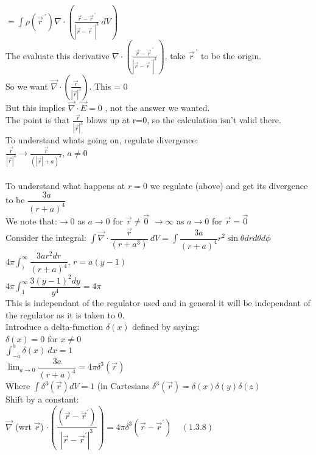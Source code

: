 \documentclass[a4paper,11pt]{article}
\begin{document}
$=  \int \rho (\vec{r}^{~'}) \nabla \cdot (\frac{\vec{r} - \vec{r}^{~'}}{|\vec{r} - \vec{r}^{~'}|^3}~dV)$\\
The evaluate this derivative $ \nabla \cdot (\frac{\vec{r} - \vec{r}^{~'}}{|\vec{r} - \vec{r}^{~'}|^3})$, take $\vec{r}^{~'}$ to be the origin.\\
So we want $\vec{\nabla} \cdot (\frac{\vec{r}}{|\vec{r}|^3})$. This = 0\\
But this implies $\vec{\nabla} \cdot \vec{E} = 0$ , not the answer we wanted.\\
The point is that $\frac{\vec{r}}{|\vec{r}|^3}$ blows up at r=0, so the calculation isn't valid there.\\
To understand whats going on, regulate divergence:\\
$\frac{\vec{r}}{|\vec{r}|^3} \rightarrow \frac{\vec{r}}{(|\vec{r}|+a)^3}$, $a\neq 0$\\
\\
To understand what happens at $r=0$ we regulate (above) and get its divergence to be $\dfrac{3a}{(r+a)^4}$\\
We note that:$\rightarrow 0$ as $a\rightarrow 0$ for $\vec{r}\neq \vec{0}$
$\rightarrow \infty$ as $a\rightarrow 0$ for $\vec{r} = \vec{0}$\\
Consider the integral:
$\int \vec{\nabla} \cdot \dfrac{\vec{r}}{(r+a^3)} ~dV = \int \dfrac{3a}{(r+a)^4} r^2 \sin{\theta} dr d\theta d\phi$\\
$4\pi \int _) ^\infty \dfrac{3ar^2 dr}{(r+a)^4}$,     $r=a(y-1)$\\
$4\pi \int_1 ^\infty \dfrac{3(y-1)^2 dy}{y^4} = 4\pi$\\
This is independant of the regulator used and in general it will be independant of the regulator as it is taken to 0.\\
Introduce a delta-function $\delta (x)$ defined by saying:\\
$\delta(x)=0$ for $x\neq 0$\\
$\int^a _{-a} \delta(x) ~dx =1$\\
$\lim _{a \rightarrow 0} \dfrac{3a}{(r+a)^4} = 4\pi \delta ^3 (\vec{r})$\\
Where $\int \delta^3(\vec{r})dV=1$ (in Cartesians $\delta^3(\vec{r})=\delta(x)\delta(y)\delta(z)$\\
Shift by a constant:\\
$\vec{\nabla}$ (wrt $\vec{r}$) $\cdot (\dfrac{(\vec{r}-\vec{r}^{'})}{|\vec{r} - \vec{r} ^{'}|^3})=4\pi \delta^3 (\vec{r} - \vec{r}^{'})~~~~~(1.3.8)$\\
\end{document}
